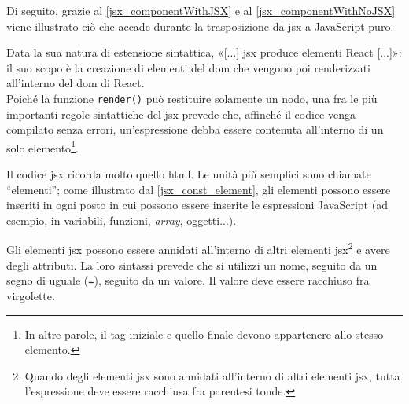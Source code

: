 

Di seguito, grazie al \autoref{jsx_componentWithJSX} e al \autoref{jsx_componentWithNoJSX} viene illustrato ciò che accade durante la trasposizione da \acrshort{jsx} a JavaScript puro.





Data la sua natura di estensione sintattica, «[...] \acrshort{jsx} produce elementi React [...]»\cite{React_IntroduzioneJSX}: il suo scopo è la creazione di elementi del \gls{dom} che vengono poi renderizzati all'interno del \gls{dom} di React.\\
Poiché la funzione \texttt{render()} può restituire solamente un nodo, una fra le più importanti regole sintattiche del \acrshort{jsx} prevede che, affinché il codice venga compilato senza errori, un'espressione debba essere contenuta all'interno di un solo elemento\footnote{In altre parole, il tag iniziale e quello finale devono appartenere allo stesso elemento.}.

Il codice \acrshort{jsx} ricorda molto quello \gls{html}. Le unità più semplici sono chiamate “elementi”; come illustrato dal \autoref{jsx_const_element}, gli elementi possono essere inseriti in ogni posto in cui possono essere inserite le espressioni JavaScript (ad esempio, in variabili, funzioni, \textit{array}, oggetti...). 


Gli elementi \acrshort{jsx} possono essere annidati all'interno di altri elementi \acrshort{jsx}\footnote{Quando degli elementi \acrshort{jsx} sono annidati all'interno di altri elementi \acrshort{jsx}, tutta l'espressione deve essere racchiusa fra parentesi tonde.} e avere degli attributi. La loro sintassi prevede che si utilizzi un nome, seguito da un segno di uguale (\texttt{=}), seguito da un valore. Il valore deve essere racchiuso fra virgolette. 

